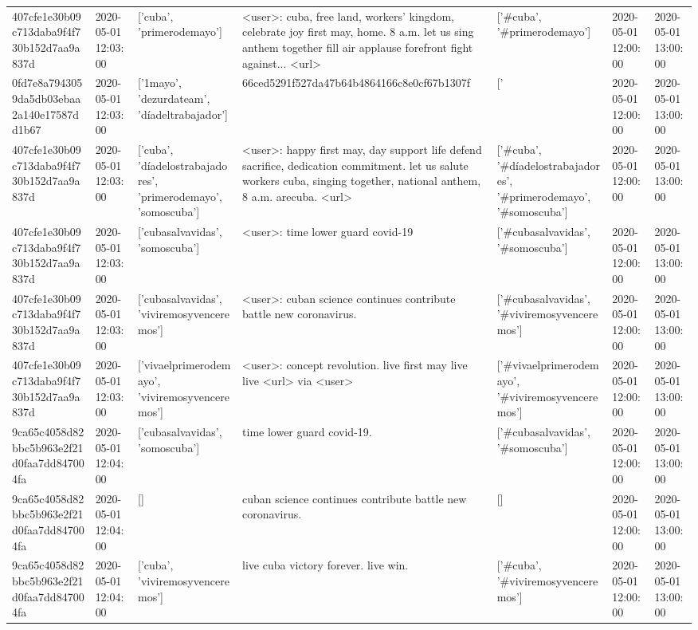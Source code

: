 \begin{tabular}{lllllll}
407cfe1e30b09c713daba9f4f730b152d7aa9a837d & 2020-05-01 12:03:00 & ['cuba', 'primerodemayo'] & <user>: cuba, free land, workers' kingdom, celebrate joy first may, home. 8 a.m. let us sing anthem together fill air applause forefront fight against... <url> & ['#cuba', '#primerodemayo'] & 2020-05-01 12:00:00 & 2020-05-01 13:00:00 \\
0fd7e8a7943059da5db03ebaa2a140e17587dd1b67 & 2020-05-01 12:03:00 & ['1mayo', 'dezurdateam', 'díadeltrabajador'] & 66ced5291f527da47b64b4864166c8e0cf67b1307f & ['#1mayo', '#dezurdateam', '#díadeltrabajador'] & 2020-05-01 12:00:00 & 2020-05-01 13:00:00 \\
407cfe1e30b09c713daba9f4f730b152d7aa9a837d & 2020-05-01 12:03:00 & ['cuba', 'díadelostrabajadores', 'primerodemayo', 'somoscuba'] & <user>: happy first may, day support life defend sacrifice, dedication commitment. let us salute workers cuba, singing together, national anthem, 8 a.m. arecuba. <url> & ['#cuba', '#díadelostrabajadores', '#primerodemayo', '#somoscuba'] & 2020-05-01 12:00:00 & 2020-05-01 13:00:00 \\
407cfe1e30b09c713daba9f4f730b152d7aa9a837d & 2020-05-01 12:03:00 & ['cubasalvavidas', 'somoscuba'] & <user>: time lower guard covid-19 & ['#cubasalvavidas', '#somoscuba'] & 2020-05-01 12:00:00 & 2020-05-01 13:00:00 \\
407cfe1e30b09c713daba9f4f730b152d7aa9a837d & 2020-05-01 12:03:00 & ['cubasalvavidas', 'viviremosyvenceremos'] & <user>: cuban science continues contribute battle new coronavirus. & ['#cubasalvavidas', '#viviremosyvenceremos'] & 2020-05-01 12:00:00 & 2020-05-01 13:00:00 \\
407cfe1e30b09c713daba9f4f730b152d7aa9a837d & 2020-05-01 12:03:00 & ['vivaelprimerodemayo', 'viviremosyvenceremos'] & <user>: concept revolution. live first may live live <url> via <user> & ['#vivaelprimerodemayo', '#viviremosyvenceremos'] & 2020-05-01 12:00:00 & 2020-05-01 13:00:00 \\
9ca65c4058d82bbc5b963e2f21d0faa7dd847004fa & 2020-05-01 12:04:00 & ['cubasalvavidas', 'somoscuba'] & time lower guard covid-19. & ['#cubasalvavidas', '#somoscuba'] & 2020-05-01 12:00:00 & 2020-05-01 13:00:00 \\
9ca65c4058d82bbc5b963e2f21d0faa7dd847004fa & 2020-05-01 12:04:00 & [] & cuban science continues contribute battle new coronavirus. & [] & 2020-05-01 12:00:00 & 2020-05-01 13:00:00 \\
9ca65c4058d82bbc5b963e2f21d0faa7dd847004fa & 2020-05-01 12:04:00 & ['cuba', 'viviremosyvenceremos'] & live cuba victory forever. live win. & ['#cuba', '#viviremosyvenceremos'] & 2020-05-01 12:00:00 & 2020-05-01 13:00:00 \\

\end{tabular}
